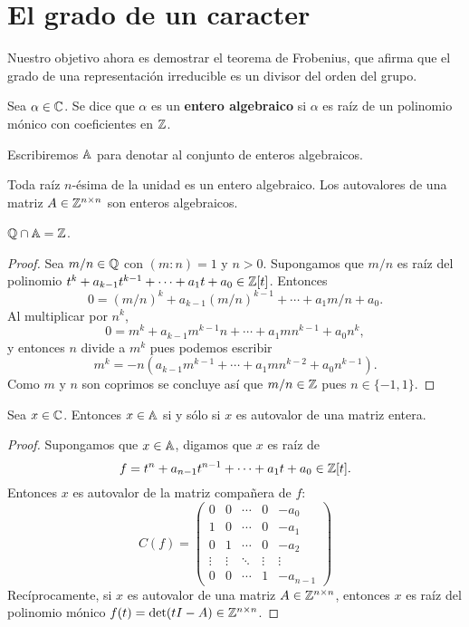 \chapter{El grado de un caracter}

Nuestro objetivo ahora es demostrar el teorema de Frobenius, que afirma
que el grado de una representación irreducible es un divisor del orden del grupo. 

\begin{definition}
	Sea $\alpha\in\mathbb{C}$. Se dice que $\alpha$ es un \textbf{entero algebraico} si
	$\alpha$ es raíz de un polinomio mónico con coeficientes en $\mathbb{Z}$.  
\end{definition}

Escribiremos $\mathbb{A}$ para denotar al conjunto de enteros algebraicos.  

Toda raíz $n$-ésima de la
unidad es un entero algebraico. Los autovalores de una matriz
$A\in\mathbb{Z}^{n\times n}$ son enteros algebraicos. 

\begin{proposition}
  \label{pro:Z}
  $\mathbb{Q}\cap\mathbb{A}=\mathbb{Z}$.
\end{proposition}

\begin{proof}
  Sea $m/n\in\mathbb{Q}$ con $(m:n)=1$ y $n>0$. Supongamos que $m/n$ es raíz del
  polinomio $t^k+a_{k-1}t^{k-1}+\cdots+a_1t+a_0\in\mathbb{Z}[t]$. Entonces
  \[
	0=(m/n)^k+a_{k-1}(m/n)^{k-1}+\cdots+a_1m/n+a_0.
  \]
  Al multiplicar por $n^k$,
  \[
	0=m^k+a_{k-1}m^{k-1}n+\cdots+a_1mn^{k-1}+a_0n^{k},
  \]
  y entonces $n$ divide a $m^k$ pues podemos escribir 
  \[
	 m^k=-n(a_{k-1}m^{k-1}+\cdots+a_1mn^{k-2}+a_0n^{k-1}). 
	\]
  Como $m$ y $n$ son coprimos se concluye así que $m/n\in\mathbb{Z}$ pues $n\in\{-1,1\}$. 
\end{proof}

\begin{lemma}
  \label{lem:matriz_entera}
  Sea $x\in\mathbb{C}$. Entonces $x\in\mathbb{A}$ si y sólo si $x$ es autovalor de una matriz
  entera. 
\end{lemma}

\begin{proof}
  Supongamos que $x\in\mathbb{A}$, digamos que $x$ es raíz de
  \[
    f=t^n+a_{n-1}t^{n-1}+\cdots+a_1t+a_0\in\mathbb{Z}[t].
  \]
  Entonces $x$ es autovalor de la matriz compañera de $f$:
  \[
    C(f)=\begin{pmatrix}
      0 & 0 & \cdots &0 & -a_0\\
      1 & 0 & \cdots &0 & -a_1\\
      0 & 1 & \cdots &0 & -a_2\\
      \vdots &\vdots & \ddots & \vdots & \vdots\\
      0 & 0 & \cdots &1 & -a_{n-1}
    \end{pmatrix}
  \]
  Recíprocamente, si $x$ es autovalor de una matriz $A\in\mathbb{Z}^{n\times n}$,
  entonces $x$ es raíz del polinomio mónico $f(t)=\det(tI-A)\in\mathbb{Z}^{n\times n}$. 
\end{proof}

